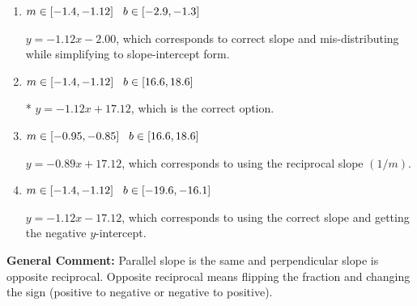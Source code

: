 \documentclass{extbook}[14pt]
\begin{document}
\begin{enumerate}
{\begin{enumerate}[label=\Alph*.]
 $y = 1.12x - 3.12$, which corresponds to using the negative slope.
\item \( m \in [-1.4, -1.12] \hspace*{3mm} b \in [-2.9, -1.3] \)

 $y = -1.12x - 2.00$, which corresponds to correct slope and mis-distributing while simplifying to slope-intercept form.
\item \( m \in [-1.4, -1.12] \hspace*{3mm} b \in [16.6, 18.6] \)

* $y = -1.12x + 17.12$, which is the correct option.
\item \( m \in [-0.95, -0.85] \hspace*{3mm} b \in [16.6, 18.6] \)

 $y = -0.89x + 17.12$, which corresponds to using the reciprocal slope $(1/m)$.
\item \( m \in [-1.4, -1.12] \hspace*{3mm} b \in [-19.6, -16.1] \)

 $y = -1.12x - 17.12$, which corresponds to using the correct slope and getting the negative $y$-intercept.
\end{enumerate}

\textbf{General Comment:} Parallel slope is the same and perpendicular slope is opposite reciprocal. Opposite reciprocal means flipping the fraction and changing the sign (positive to negative or negative to positive).
}
\end{enumerate}
\end{document}
